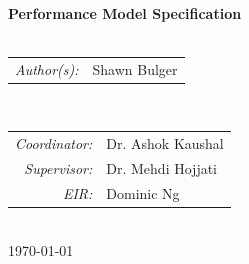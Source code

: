 \documentclass[]{article}
\begin{document}
\begin{titlepage}

\HRule \\[0.6cm]
{ \Huge \bfseries 
Performance Model Specification
}\\[0.4cm] 

\HRule \\[1cm]
 

\begin{minipage}{0.4\textwidth}
\begin{flushleft} \large
	\begin{tabular} {r l} 
        \emph{Author(s):} & Shawn Bulger	\\
	\end{tabular}
\end{flushleft}
\end{minipage}
~
\begin{minipage}{0.4\textwidth}
\begin{flushright} \large
	\begin{tabular} {r l} 
		\emph{Coordinator:} & Dr. Ashok Kaushal 		\\
		\emph{Supervisor:}  & Dr. Mehdi Hojjati 		\\
		\emph{EIR:}         & Dominic Ng  		        \\
	\end{tabular}
\end{flushright}
\end{minipage}\\[2cm]


{\large \today}\\[2cm] %

\vfill %

\end{titlepage}

{
\hypersetup{linkcolor=black}
\setcounter{tocdepth}{3}
\tableofcontents
\clearpage
}
\listoftables
\listoffigures
\clearpage
\end{document}
